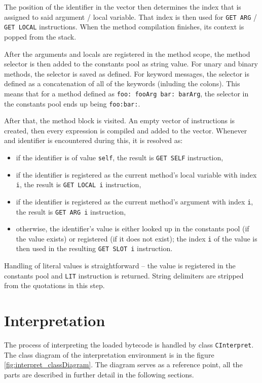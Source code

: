 \documentclass[thesis=M,english]{FITthesis}[2019/12/23]
\begin{document}
The position of the identifier in the vector then determines the index that is assigned to said argument / local variable. That index is then used for
\texttt{GET ARG} / \texttt{GET LOCAL} instructions. When the method compilation finishes, its context is popped from the stack.

After the arguments and locals are registered in the method scope, the method selector is then added to the constants pool as string value. For unary and binary
methods, the selector is saved as defined. For keyword messages, the selector is defined as a concatenation of all of the keywords (inluding the colons). This means
that for a method defined as \texttt{foo: fooArg bar: barArg}, the selector in the constants pool ends up being \texttt{foo:bar:}.

After that, the method block is visited. An empty vector of instructions is created, then every expression is compiled and added to the vector. Whenever and identifier
is encountered during this, it is resolved as:
\begin{itemize}
	\item if the identifier is of value \texttt{self}, the result is \texttt{GET SELF} instruction,
	\item if the identifier is registered as the current method's local variable with index \texttt{i}, the result is \texttt{GET LOCAL i} instruction,
	\item if the identifier is registered as the current method's argument with index \texttt{i}, the result is \texttt{GET ARG i} instruction,
	\item otherwise, the identifier's value is either looked up in the constants pool (if the value exists) or registered (if it does not exist);
		the index \texttt{i} of the value is then used in the resulting \texttt{GET SLOT i} instruction.
\end{itemize}

Handling of literal values is straightforward -- the value is registered in the constants pool and \texttt{LIT} instruction is returned. String delimiters are stripped
from the quotations in this step.

\section{Interpretation}
The process of interpreting the loaded bytecode is handled by class \texttt{CInterpret}. The class diagram of the interpretation environment is
in the figure \ref{fig:interpret_classDiagram}. The diagram serves as a reference point, all the parts are described in further detail in the
following sections.
\end{document}
